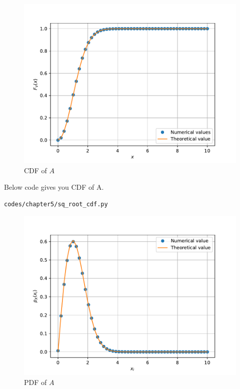 \documentclass[journal,15pt,twocolumn]{IEEEtran}
\begin{document}
\begin{enumerate}
\begin{figure}[H]
\centering
\includegraphics[width=\columnwidth]{./figs/chapter5/sqroot_cdf.pdf}
\caption{CDF of $A$}
\label{fig:rayleigh_cdf}
\end{figure}
Below code gives you CDF of A.
\begin{lstlisting}
codes/chapter5/sq_root_cdf.py
\end{lstlisting}
\begin{figure}[H]
\centering
\includegraphics[width=\columnwidth]{./figs/chapter5/sqroot_pdf.pdf}
\caption{PDF of $A$}
\end{figure}
%
\end{enumerate}
%
\end{document}

